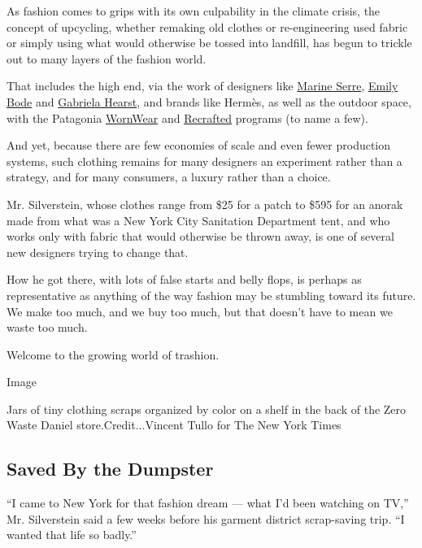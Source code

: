 As fashion comes to grips with its own culpability in the climate
crisis, the concept of upcycling, whether remaking old clothes or
re-engineering used fabric or simply using what would otherwise be
tossed into landfill, has begun to trickle out to many layers of the
fashion world.

That includes the high end, via the work of designers like
\href{https://www.thecut.com/2019/11/marine-serre-upcycling-videos.html}{Marine
Serre},
\href{https://www.nytimes3xbfgragh.onion/2019/11/18/style/bode-emily-bode-shopping-brick-and-mortar-is-dead-lets-open-a-store.html}{Emily
Bode} and
\href{https://www.nytimes3xbfgragh.onion/2019/09/11/style/proenza-schouler-gabriela-hearst-new-york-fashion-week.html}{Gabriela
Hearst}, and brands like Hermès, as well as the outdoor space, with the
Patagonia
\href{https://mountainculturegroup.com/patagonia-worn-wear-program-review/}{WornWear}
and \href{https://wornwear.patagonia.com/shop/recrafted}{Recrafted}
programs (to name a few).

And yet, because there are few economies of scale and even fewer
production systems, such clothing remains for many designers an
experiment rather than a strategy, and for many consumers, a luxury
rather than a choice.

Mr. Silverstein, whose clothes range from \$25 for a patch to \$595 for
an anorak made from what was a New York City Sanitation Department tent,
and who works only with fabric that would otherwise be thrown away, is
one of several new designers trying to change that.

How he got there, with lots of false starts and belly flops, is perhaps
as representative as anything of the way fashion may be stumbling toward
its future. We make too much, and we buy too much, but that doesn't have
to mean we waste too much.

Welcome to the growing world of trashion.

Image

Jars of tiny clothing scraps organized by color on a shelf in the back
of the Zero Waste Daniel store.Credit...Vincent Tullo for The New York
Times

\hypertarget{saved-by-the-dumpster}{%
\subsection{Saved By the Dumpster}\label{saved-by-the-dumpster}}

``I came to New York for that fashion dream --- what I'd been watching
on TV,'' Mr. Silverstein said a few weeks before his garment district
scrap-saving trip. ``I wanted that life so badly.''

